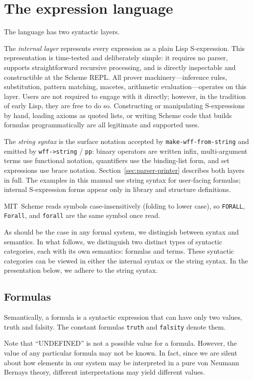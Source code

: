 \chapter{The expression language}
\label{sec:language}


The language has two syntactic layers.

The \emph{internal layer} represents every expression as a plain
Lisp S-expression.  This representation is time-tested and deliberately
simple: it requires no parser, supports straightforward recursive
processing, and is directly inspectable and constructible at the Scheme
REPL.  All prover machinery---inference rules, substitution, pattern
matching, macetes, arithmetic evaluation---operates on this layer.
Users are not required to engage with it directly; however, in the
tradition of early Lisp, they are free to do so.  Constructing or
manipulating S-expressions by hand, loading axioms as quoted lists,
or writing Scheme code that builds formulas programmatically are all
legitimate and supported uses.

The \emph{string syntax} is the surface notation accepted by
\texttt{make-wff-from-string} and emitted by \texttt{wff->string}
/ \texttt{pp}: binary operators are written infix, multi-argument
terms use functional notation, quantifiers use the binding-list form,
and set expressions use brace notation.
Section~\ref{sec:parser-printer} describes both layers in full.
The examples in this manual use string syntax for user-facing
formulas; internal S-expression forms appear only in library and
structure definitions.

MIT~Scheme reads symbols case-insensitively (folding to lower case),
so \texttt{FORALL}, \texttt{Forall}, and \texttt{forall} are the same
symbol once read.

As should be the case in any formal system, we distingish between
syntax and semantics. In what follows, we distinguish two distinct
types of syntactic categories, each with its own semantics: formulas
and terms. These syntactic categories can be viewed in either the
internal syntax or the string syntax. In the presentation below, we
adhere to the string syntax.


\section{Formulas}

Semantically, a formula is a syntactic expression that can have only
two values, truth and falsity.  The constant formulas \texttt{truth} and
\texttt{falsity} denote them.
%
\begin{remark}\label{remark:27137-52766-301830}
%
Note that ``UNDEFINED'' is not a possible value for a
formula. However, the value of any particular formula may not be
known. In fact, since we are silent about how elements in our system
may be interpreted in a pure von Neumann Bernays theory, different
interpretations may yield different values.
%
\end{remark}

